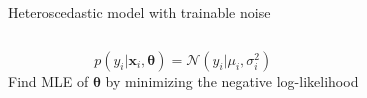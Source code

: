 \documentclass[handout]{beamer}
\begin{document}
\begin{frame}{Heteroscedastic model with trainable noise}
\begin{columns}[T,onlytextwidth]
        \begin{equation*}
            p(y_i| \boldsymbol{x}_i, \boldsymbol{\theta}) = \mathcal{N}(y_i | \mu_i, \sigma_i^2)
        \end{equation*}
        Find MLE of $\boldsymbol{\theta}$ by minimizing the negative log-likelihood

    \end{columns}
\end{frame}
\end{document}
